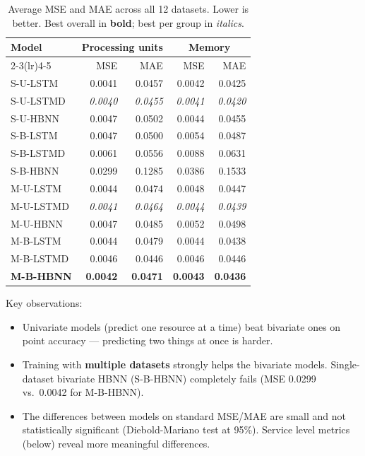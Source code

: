 \documentclass[12pt,a4paper]{article}
\begin{document}
\begin{table}[H]
\centering
\small
\caption{Average MSE and MAE across all 12 datasets. Lower is better.
         Best overall in \textbf{bold}; best per group in \textit{italics}.}
\begin{tabular}{@{}lrrrr@{}}
\toprule
\textbf{Model} &
  \multicolumn{2}{c}{\textbf{Processing units}} &
  \multicolumn{2}{c}{\textbf{Memory}} \\
\cmidrule(lr){2-3}\cmidrule(lr){4-5}
& MSE & MAE & MSE & MAE \\
\midrule
S-U-LSTM   & 0.0041 & 0.0457 & 0.0042 & 0.0425 \\
S-U-LSTMD  & \textit{0.0040} & \textit{0.0455} & \textit{0.0041} & \textit{0.0420} \\
S-U-HBNN   & 0.0047 & 0.0502 & 0.0044 & 0.0455 \\
\midrule
S-B-LSTM   & 0.0047 & 0.0500 & 0.0054 & 0.0487 \\
S-B-LSTMD  & 0.0061 & 0.0556 & 0.0088 & 0.0631 \\
S-B-HBNN   & 0.0299 & 0.1285 & 0.0386 & 0.1533 \\
\midrule
M-U-LSTM   & 0.0044 & 0.0474 & 0.0048 & 0.0447 \\
M-U-LSTMD  & \textit{0.0041} & \textit{0.0464} & \textit{0.0044} & \textit{0.0439} \\
M-U-HBNN   & 0.0047 & 0.0485 & 0.0052 & 0.0498 \\
\midrule
M-B-LSTM   & 0.0044 & 0.0479 & 0.0044 & 0.0438 \\
M-B-LSTMD  & 0.0046 & 0.0446 & 0.0046 & 0.0446 \\
\textcolor{rossicolor}{\textbf{M-B-HBNN}} &
  \textbf{0.0042} & \textbf{0.0471} &
  \textbf{0.0043} & \textbf{0.0436} \\
\bottomrule
\end{tabular}
\end{table}

Key observations:
\begin{itemize}
  \item Univariate models (predict one resource at a time) beat bivariate ones
        on point accuracy --- predicting two things at once is harder.
  \item Training with \textbf{multiple datasets} strongly helps the bivariate
        models. Single-dataset bivariate HBNN (S-B-HBNN) completely fails
        (MSE 0.0299 vs.\ 0.0042 for M-B-HBNN).
  \item The differences between models on standard MSE/MAE are small and
        not statistically significant (Diebold-Mariano test at 95\%).
        Service level metrics (below) reveal more meaningful differences.
\end{itemize}
\end{document}
